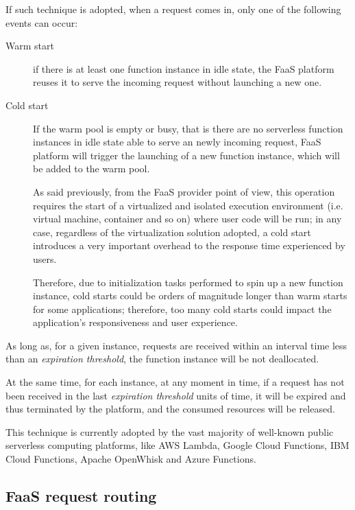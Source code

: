 \documentclass[12pt,a4paper]{report}
\begin{document}
If such technique is adopted, when a request comes in, only one of the following events can occur:

\begin{description}
	
	\item[Warm start] if there is at least one function instance in idle state, the FaaS platform reuses it to serve the incoming request without launching a new one.
	
	\item[Cold start] If the warm pool is empty or busy, that is there are no serverless function instances in idle state able to serve an newly incoming request, FaaS platform will trigger the launching of a new function instance, which will be added to the warm pool.
	
	As said previously, from the FaaS provider point of view, this operation requires the start of a virtualized and isolated execution environment (i.e. virtual machine, container and so on) where user code will be run; in any case, regardless of the virtualization solution adopted, a cold start introduces a very important overhead to the response time experienced by users. 
	
	Therefore, due to initialization tasks performed to spin up a new function instance, cold starts could be orders of magnitude longer than warm starts for some applications; therefore, too many cold starts could impact the application’s responsiveness and user experience.
\end{description} 

As long as, for a given instance, requests are received within an interval time less than an \textit{expiration threshold}, the function instance will be not deallocated.

At the same time, for each instance, at any moment in time, if a request has not been received in the last \textit{expiration threshold} units of time, it will be expired and thus terminated by the platform, and the consumed resources will be released. 

This technique is currently adopted by the vast majority of well-known public serverless computing platforms, like AWS Lambda, Google Cloud Functions, IBM Cloud Functions, Apache OpenWhisk and Azure Functions. 

\subsection{FaaS request routing}
\end{document}
